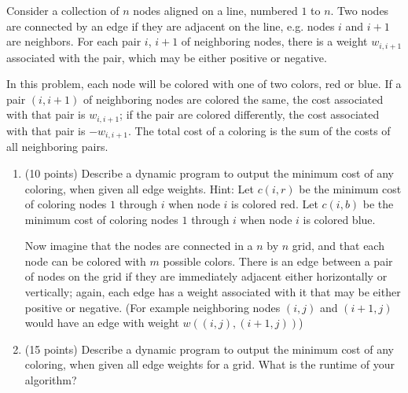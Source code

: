 \documentclass[11pt]{article}
\begin{document}
\begin{enumerate}
\begin{enumerate}
\end{enumerate}
 
 
 

Consider a collection of $n$ nodes aligned on a line, numbered $1$ to $n$.  Two nodes are connected by an edge if they are adjacent on the line, e.g. nodes $i$ and $i+1$ are neighbors.  For each pair $i$, $i+1$ of neighboring nodes, there is a weight $w_{i,i+1}$ associated with the pair, which may be either positive or negative.

In this problem, each node will be colored with one of two colors, red or blue.  If a pair $(i,i+1)$ of neighboring nodes are colored the same, the cost associated with that pair is $w_{i,i+1}$; if the pair are colored differently, the cost associated with that pair is $-w_{i,i+1}$.   The total cost of a coloring is the sum of the costs of all neighboring pairs.

\begin{enumerate}

\item (10 points) Describe a dynamic program to output the minimum cost of any coloring, when given all edge weights.  Hint: Let $c(i,r)$ be the minimum cost of coloring nodes $1$ through $i$ when node $i$ is colored red.  Let $c(i,b)$ be the minimum cost of coloring nodes $1$ through $i$ when node $i$ is colored blue.


\pagebreak

Now imagine that the nodes are connected in a $n$ by $n$ grid, and that each node can be colored with $m$ possible colors.  There is an edge between a pair of nodes on the grid if they are immediately adjacent either horizontally or vertically; again, each edge has a weight associated with it that may be either positive or negative.  (For example neighboring nodes $(i,j)$ and $(i+1,j)$ would have an edge with weight $w((i,j),(i+1,j))$) 

\item (15 points) Describe a dynamic program to output the minimum cost of any coloring, when given all edge weights for a grid.  What is the runtime of your algorithm?

 
 \end{enumerate}

\pagebreak

 


 \end{enumerate}
 
  
\end{document}
